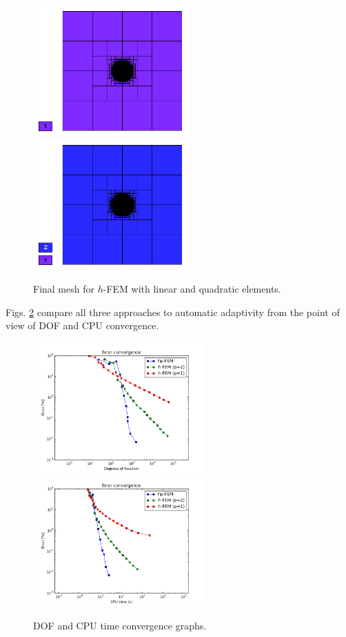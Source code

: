 \documentclass[12pt]{elsarticle}
\begin{document}
\begin{figure}[!ht]
\centering
\includegraphics[height=5cm]{nist/nist-4/mesh_h1_aniso.png}\ \
\includegraphics[height=5cm]{nist/nist-4/mesh_h2_aniso.png}
\caption{Final mesh for $h$-FEM with linear and quadratic elements.}
\label{fig:nist-4-h-aniso}
\end{figure}

Figs. \ref{fig:nist-4-conv} compare all
three approaches to automatic adaptivity from the point
of view of DOF and CPU convergence.

\begin{figure}[!ht]
\centering
\includegraphics[height=5cm]{nist/nist-4/conv_dof_aniso.png}\ \
\includegraphics[height=5cm]{nist/nist-4/conv_cpu_aniso.png}
\caption{DOF and CPU time convergence graphs.}
\label{fig:nist-4-conv}
\end{figure}
\end{document}

